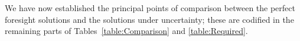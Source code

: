 \documentclass[BufferStockTheory]{subfiles}
\begin{document}
\begin{comment}
  
Finally, we are entitled to conclude that $\lim_{\mRat \uparrow \infty} \MPC(\mRat) = \MinMPC$ because, for any fixed value of $\pZero > 0$, and any fixed horizon $n$ it must be true that:
\begin{enumerate}
\item $\usual{\cFunc}_{T-n}(\mRat) < \bar{\cFunc}_{T-n}$ for the reasons described in the section on the liquidity constrained model above
  \item As $\mRat \uparrow \infty$ the \textit{amount} by which $\bar{\cFunc}$ exceeds $\usual{\cFunc}$ approaches zero.
\end{enumerate}

\end{comment}

We have now established the principal points of comparison between the perfect foresight solutions and the solutions under uncertainty; these are codified in the remaining parts of Tables~\ref{table:Comparison} and \ref{table:Required}.

\hypertarget{Factors-Defined-And-Compared}{}


\hypertarget{Sufficient-Conditions}{}
\hypertarget{Sufficient-Conditions-For-Nondegenerate-Solution}{}

\end{document}
